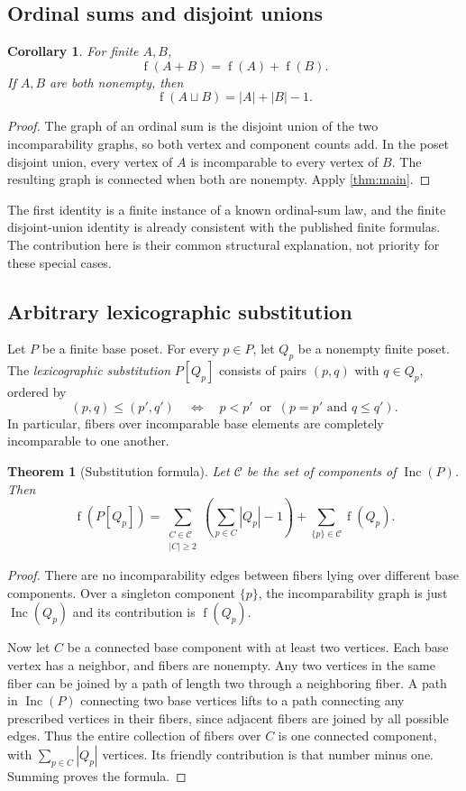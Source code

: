 \documentclass[11pt,letterpaper]{article}
\newtheorem{theorem}{Theorem}[section]
\newtheorem{corollary}[corollary]{Corollary}
\theoremstyle{definition}
\theoremstyle{remark}
\newcommand{\fot}{\operatorname{f}}
\newcommand{\Inc}{\operatorname{Inc}}
\begin{document}
\subsection{Ordinal sums and disjoint unions}
\begin{corollary}\label{cor:finite-sums}
For finite $A,B$,
\[
 \fot(A+B)=\fot(A)+\fot(B).
\]
If $A,B$ are both nonempty, then
\[
 \fot(A\sqcup B)=|A|+|B|-1.
\]
\end{corollary}
\begin{proof}
The graph of an ordinal sum is the disjoint union of the two incomparability
graphs, so both vertex and component counts add. In the poset disjoint union,
every vertex of $A$ is incomparable to every vertex of $B$. The resulting
graph is connected when both are nonempty. Apply \cref{thm:main}.
\end{proof}
The first identity is a finite instance of a known ordinal-sum law, and the
finite disjoint-union identity is already consistent with the published
finite formulas. The contribution here is their common structural explanation,
not priority for these special cases.

\subsection{Arbitrary lexicographic substitution}
Let $P$ be a finite base poset. For every $p\in P$, let $Q_p$ be a nonempty
finite poset. The \emph{lexicographic substitution} $P[Q_p]$ consists of
pairs $(p,q)$ with $q\in Q_p$, ordered by
\[
 (p,q)\leq(p',q')
 \quad\Longleftrightarrow\quad
 p<p'\ \text{ or }\ (p=p'\text{ and }q\leq q').
\]
In particular, fibers over incomparable base elements are completely
incomparable to one another.

\begin{theorem}[Substitution formula]\label{thm:substitution}
Let $\mathcal C$ be the set of components of $\Inc(P)$. Then
\begin{equation}\label{eq:substitution}
 \boxed{\displaystyle
 \fot(P[Q_p])=
 \sum_{\substack{C\in\mathcal C\\|C|\geq2}}
       \left(\sum_{p\in C}|Q_p|-1\right)
 +\sum_{\{p\}\in\mathcal C}\fot(Q_p).}
\end{equation}
\end{theorem}
\begin{proof}
There are no incomparability edges between fibers lying over different base
components. Over a singleton component $\{p\}$, the incomparability graph
is just $\Inc(Q_p)$ and its contribution is $\fot(Q_p)$.

Now let $C$ be a connected base component with at least two vertices. Each
base vertex has a neighbor, and fibers are nonempty. Any two vertices in
the same fiber can be joined by a path of length two through a neighboring
fiber. A path in $\Inc(P)$ connecting two base vertices lifts to a path
connecting any prescribed vertices in their fibers, since adjacent fibers
are joined by all possible edges. Thus the entire collection of fibers over
$C$ is one connected component, with $\sum_{p\in C}|Q_p|$ vertices.
Its friendly contribution is that number minus one. Summing proves the formula.
\end{proof}
\end{document}

